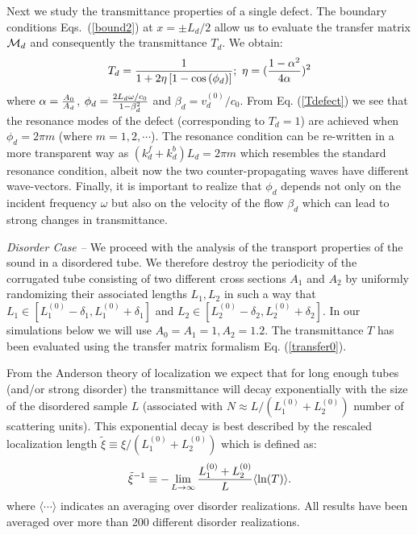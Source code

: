\documentclass[aps,prl,twocolumn,groupedaddress,amsmath,amssymb]{revtex4}
\begin{document}
Next we study the transmittance properties of a single defect. The  boundary conditions Eqs.~(\ref{bound2}) at $x=
\pm L_d/2$ allow us to evaluate the transfer matrix ${\cal M}_d$ and consequently the transmittance $T_d$. We
obtain:
\begin{equation}
\label{Tdefect}
T_d={1\over 1+2 \eta \left[1-\cos\left(\phi_d\right)\right]};\,\,\eta=({1-\alpha^2\over 4 \alpha})^2
\end{equation}
where $\alpha={A_0\over A_d}$, $\phi_d={2 L_d\omega/c_0\over 1-\beta_d^2}$ and $\beta_d=v_d^{(0)}/c_0$. From Eq. (\ref{Tdefect}) 
we see that the resonance modes of the defect (corresponding to $T_d=1$)
are achieved when $\phi_d=2\pi m$ (where $m=1, 2,\cdots$). The resonance
condition can be re-written in a more transparent way as $(k_d^f+k_d^b) L_d= 2\pi m$ which resembles the standard
resonance condition, albeit now the two counter-propagating waves have different wave-vectors. Finally, it
is important to realize that $\phi_d$ depends not only on the incident frequency $\omega$ but also on the velocity
of the flow $\beta_d$ which can lead to strong changes in transmittance.



{\it Disorder Case --} We proceed with the analysis of the transport properties of the sound in a disordered tube. We therefore destroy
the periodicity of the corrugated tube consisting of two different cross sections $A_1$ and $A_2$ by uniformly randomizing their associated
lengths $L_1, L_2$ in such a way that $L_1\in [L_1^{(0)}-\delta_1, L_1^{(0)}+\delta_1]$ and $L_2\in [L_2^{(0)}-\delta_2, L_2^{(0)}+\delta_2]$.
In our simulations below we will use $A_0=A_1=1, A_2=1.2$. The transmittance $T$ has
been evaluated using the transfer matrix formalism Eq. (\ref{transfer0}). 

From the Anderson theory of localization we expect that for long enough tubes (and/or strong disorder) the transmittance will decay
exponentially with the size of the disordered sample $L$ (associated with $N\approx L/(L_1^{(0)}+L_2^{(0)})$ number of scattering units). 
This exponential decay is best described by the rescaled localization length 
${\tilde \xi}\equiv \xi/(L_1^{(0)}+L_2^{(0)})$ which is defined as:
\begin{equation}
\label{loclength}
{\tilde \xi}^{-1}\equiv -\lim_{L\rightarrow \infty} {L_1^{(0)}+L_2^{(0)}\over L}\langle\ln (T)\rangle.
\end{equation}
where $\langle \cdots\rangle$ indicates an averaging over disorder realizations. All results 
have been averaged over more than 200 different disorder realizations.
\end{document}

